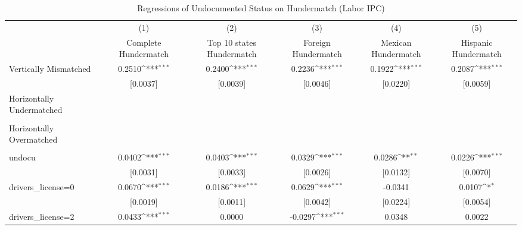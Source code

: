 \begin{table}[htbp]\centering
\def\sym#1{\ifmmode^{#1}\else\(^{#1}\)\fi}
\caption{Regressions of Undocumented Status on Hundermatch (Labor IPC)}
\begin{tabular}{l*{5}{c}}
\toprule
                    &\multicolumn{1}{c}{(1)}         &\multicolumn{1}{c}{(2)}         &\multicolumn{1}{c}{(3)}         &\multicolumn{1}{c}{(4)}         &\multicolumn{1}{c}{(5)}         \\
                    &Complete Hundermatch         &Top 10 states Hundermatch         &Foreign Hundermatch         &Mexican Hundermatch         &Hispanic Hundermatch         \\
\midrule
Vertically Mismatched&      0.2510\sym{***}&      0.2400\sym{***}&      0.2236\sym{***}&      0.1922\sym{***}&      0.2087\sym{***}\\
                    &    [0.0037]         &    [0.0039]         &    [0.0046]         &    [0.0220]         &    [0.0059]         \\
\addlinespace
Horizontally Undermatched&                     &                     &                     &                     &                     \\
                    &                     &                     &                     &                     &                     \\
\addlinespace
Horizontally Overmatched&                     &                     &                     &                     &                     \\
                    &                     &                     &                     &                     &                     \\
\addlinespace
undocu              &      0.0402\sym{***}&      0.0403\sym{***}&      0.0329\sym{***}&      0.0286\sym{**} &      0.0226\sym{***}\\
                    &    [0.0031]         &    [0.0033]         &    [0.0026]         &    [0.0132]         &    [0.0070]         \\
\addlinespace
drivers\_license=0   &      0.0670\sym{***}&      0.0186\sym{***}&      0.0629\sym{***}&     -0.0341         &      0.0107\sym{*}  \\
                    &    [0.0019]         &    [0.0011]         &    [0.0042]         &    [0.0224]         &    [0.0054]         \\
\addlinespace
drivers\_license=2   &      0.0433\sym{***}&      0.0000         &     -0.0297\sym{***}&      0.0348         &      0.0022         \\

\end{tabular}
\end{table}
